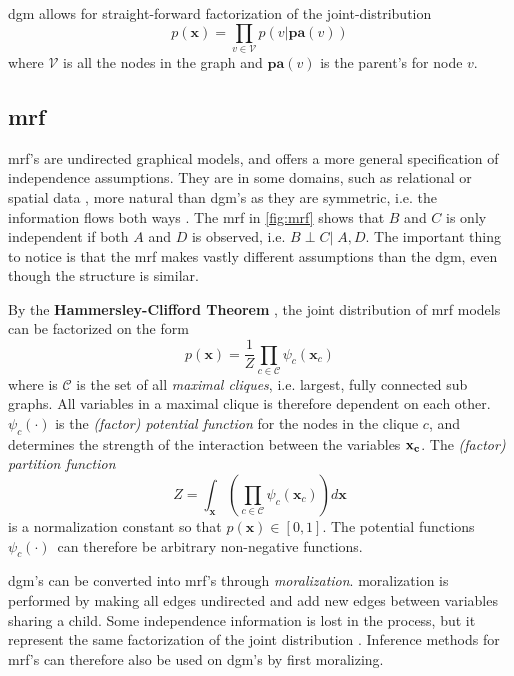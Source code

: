 \acrshort{dgm} allows for straight-forward factorization of the joint-distribution 
\begin{equation}\label{eq:dgm_factorization}
    p(\mathbf{x}) = \prod_{v \in \mathcal{V}}p(v | \mathbf{pa}(v))
\end{equation}
where $\mathcal{V}$ is all the nodes in the graph and $\mathbf{pa}(v)$ is the parent's for node $v$. 

\subsection{\acrfull{mrf}}

\acrshort{mrf}'s are undirected graphical models, and offers a more general specification of independence assumptions. They are in some domains, such as relational or spatial data , more natural than \acrshort{dgm}'s as they are symmetric, i.e. the information flows both ways \cite{murphy}. The \acrshort{mrf} in \cref{fig:mrf} shows that $B$ and $C$ is only independent if both $A$ and $D$ is observed, i.e. $B \perp C | \; A, D$. The important thing to notice is that the \acrshort{mrf} makes vastly different assumptions than the \acrshort{dgm}, even though the structure is similar.

By the \textbf{Hammersley-Clifford Theorem} \cite[p.~ 668]{murphy}, the joint distribution of \acrshort{mrf} models can be factorized on the form
\begin{equation}
    p(\mathbf{x}) =\frac{1}{Z} \prod_{c \in \mathcal{C}} \psi_c(\mathbf{x}_c)
\end{equation}
where is $\mathcal{C}$ is the set of all \textit{maximal cliques}, i.e. largest, fully connected sub graphs. All variables in a maximal clique is therefore dependent on each other. $\psi_c(\cdot)$ is the \textit{(factor) potential function} for the nodes in the clique $c$, and determines the strength of the interaction between the variables $\bf{x}_c$. The \textit{(factor) partition function}
\begin{equation}
    Z = \int_\mathbf{x} (\prod_{c \in \mathcal{C}} \psi_c(\mathbf{x}_c)) d \mathbf{x}
\end{equation}
is a normalization constant so that $p(\mathbf{x}) \in [0, 1]$. The potential functions $\psi_c(\cdot)$ can therefore be arbitrary non-negative functions. 

\acrshort{dgm}'s can be converted into \acrshort{mrf}'s through \textit{\gls{moralization}}. \Gls{moralization} is performed by making all edges undirected and add new edges between variables sharing a child. Some independence information is lost in the process, but it represent the same factorization of the joint distribution \cite{murphy}. Inference methods for \acrshort{mrf}'s can therefore also be used on \acrshort{dgm}'s by first moralizing.



